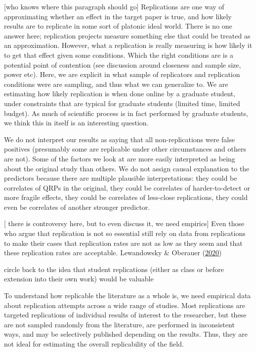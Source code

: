 \documentclass[
  english,
  a4paper,
]{article}
\begin{document}
{[}who knows where this paragraph should go{]} Replications are one way of approximating whether an effect in the target paper is true, and how likely results are to replicate in some sort of platonic ideal world. There is no one answer here; replication projects measure something else that could be treated as an approximation. However, what a replication is really measuring is how likely it to get that effect given some conditions. Which the right conditions are is a potential point of contention (see discussion around closeness and sample size, power etc). Here, we are explicit in what sample of replicators and replication conditions were are sampling, and thus what we can generalize to. We are estimating how likely replication is when done online by a graduate student, under constraints that are typical for graduate students (limited time, limited budget). As much of scientific process is in fact performed by graduate students, we think this in itself is an interesting question.

We do not interpret our results as saying that all non-replications were false positives (presumably some are replicable under other circumstances and others are not). Some of the factors we look at are more easily interpreted as being about the original study than others. We do not assign causal explanation to the predictors because there are multiple plausible interpretations: they could be correlates of QRPs in the original, they could be correlates of harder-to-detect or more fragile effects, they could be correlates of less-close replications, they could even be correlates of another stronger predictor.

{[} there is controversy here, but to even discuss it, we need empirics{]} Even those who argue that replication is not so essential still rely on data from replications to make their cases that replication rates are not as low as they seem and that these replication rates are acceptable. Lewandowsky \& Oberauer (\protect\hyperlink{ref-lewandowsky2020}{2020})

circle back to the idea that student replications (either as class or before extension into their own work) would be valuable

To understand how replicable the literature as a whole is, we need empirical data about replication attempts across a wide range of studies. Most replications are targeted replications of individual results of interest to the researcher, but these are not sampled randomly from the literature, are performed in inconsistent ways, and may be selectively published depending on the results. Thus, they are not ideal for estimating the overall replicability of the field.
\end{document}
